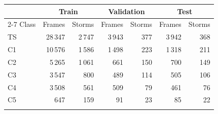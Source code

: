 \begin{tabular}{lrrrrrr}
\tophline
& \multicolumn{2}{c}{Train} & \multicolumn{2}{c}{Validation} &
\multicolumn{2}{c}{Test}\\
\cline{2-7}
Class & Frames & Storms & Frames & Storms & Frames & Storms\\
\middlehline
TS & 28\,347 & 2\,747 & 3\,943 & 377 & 3\,942 & 368\\
C1 & 10\,576 & 1\,586 & 1\,498 & 223 & 1\,318 & 211\\
C2 & 5\,265 & 1\,061 & 661 & 150 & 700 & 149\\
C3 & 3\,547 & 800 & 489 & 114 & 505 & 106\\
C4 & 3\,508 & 561 & 509 & 79 & 461 & 76\\
C5 & 647 & 159 & 91 & 23 & 85 & 22\\
\bottomhline
\end{tabular}
